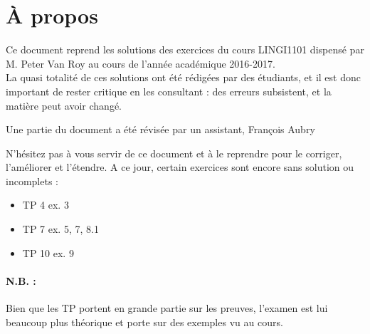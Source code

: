 \section*{À propos}
Ce document reprend les solutions des exercices du cours LINGI1101 dispensé par M. Peter Van Roy au cours de l'année académique 2016-2017.\\
La quasi totalité de ces solutions ont été rédigées par des étudiants, et il est donc important de rester critique en les consultant : des erreurs subsistent, et la matière peut avoir changé.

Une partie du document a été révisée par un assistant, François Aubry

N'hésitez pas à vous servir de ce document et à le reprendre pour le corriger, l'améliorer et l'étendre.
A ce jour, certain exercices sont encore sans solution ou incomplets : 
\begin{itemize}
	\item TP 4 ex. 3
	\item TP 7 ex. 5, 7, 8.1
	\item TP 10 ex. 9
\end{itemize}

\paragraph{\large{N.B. :}} Bien que les TP portent en grande partie sur les preuves, l'examen est lui beaucoup plus théorique et porte sur des exemples vu au cours.